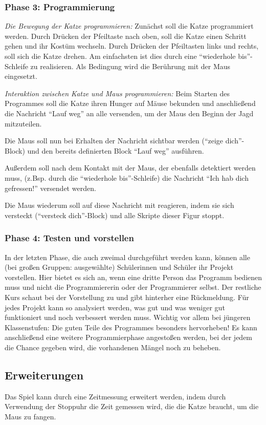 \subsubsection{Phase 3: Programmierung}\label{phase-3-programmierung}

\emph{Die Bewegung der Katze programmieren:} Zunächst soll die Katze
programmiert werden. Durch Drücken der Pfeiltaste nach oben, soll die
Katze einen Schritt gehen und ihr Kostüm wechseln. Durch Drücken der
Pfeiltasten links und rechts, soll sich die Katze drehen. Am einfachsten
ist dies durch eine ``wiederhole bis''-Schleife zu realisieren. Als
Bedingung wird die Berührung mit der Maus eingesetzt.

\emph{Interaktion zwischen Katze und Maus programmieren:} Beim Starten
des Programmes soll die Katze ihren Hunger auf Mäuse bekunden und
anschließend die Nachricht ``Lauf weg'' an alle versenden, um der Maus
den Beginn der Jagd mitzuteilen.

Die Maus soll nun bei Erhalten der Nachricht sichtbar werden (``zeige
dich''-Block) und den bereits definierten Block ``Lauf weg'' ausführen.

Außerdem soll nach dem Kontakt mit der Maus, der ebenfalls detektiert
werden muss, (z.Bsp. durch die ``wiederhole bis''-Schleife) die
Nachricht ``Ich hab dich gefressen!'' versendet werden.

Die Maus wiederum soll auf diese Nachricht mit reagieren, indem sie sich
versteckt (``versteck dich''-Block) und alle Skripte dieser Figur
stoppt.

\subsubsection{Phase 4: Testen und
vorstellen}\label{phase-4-testen-und-vorstellen}

In der letzten Phase, die auch zweimal durchgeführt werden kann, können
alle (bei großen Gruppen: ausgewählte) Schülerinnen und Schüler ihr
Projekt vorstellen. Hier bietet es sich an, wenn eine dritte Person das
Programm bedienen muss und nicht die Programmiererin oder der
Programmierer selbst. Der restliche Kurs schaut bei der Vorstellung zu
und gibt hinterher eine Rückmeldung. Für jedes Projekt kann so
analysiert werden, was gut und was weniger gut funktioniert und noch
verbessert werden muss. Wichtig vor allem bei jüngeren Klassenstufen:
Die guten Teile des Programmes besonders hervorheben! Es kann
anschließend eine weitere Programmierphase angestoßen werden, bei der
jedem die Chance gegeben wird, die vorhandenen Mängel noch zu beheben.

\subsection{Erweiterungen}\label{erweiterungen}

Das Spiel kann durch eine Zeitmessung erweitert werden, indem durch
Verwendung der Stoppuhr die Zeit gemessen wird, die die Katze braucht,
um die Maus zu fangen.
